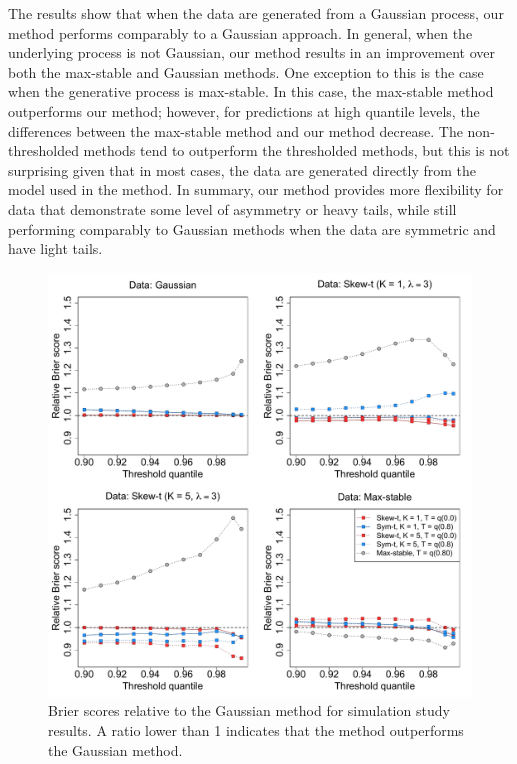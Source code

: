 \documentclass[11pt]{article}
\begin{document}
The results show that when the data are generated from a Gaussian process, our method performs comparably to a Gaussian approach.
In general, when the underlying process is not Gaussian, our method results in an improvement over both the max-stable and Gaussian methods.
One exception to this is the case when the generative process is max-stable.
In this case, the max-stable method outperforms our method; however, for predictions at high quantile levels, the differences between the max-stable method and our method decrease.
The non-thresholded methods tend to outperform the thresholded methods, but this is not surprising given that in most cases, the data are generated directly from the model used in the method.
In summary, our method provides more flexibility for data that demonstrate some level of asymmetry or heavy tails, while still performing comparably to Gaussian methods when the data are symmetric and have light tails.

\begin{figure}
  \includegraphics[width=\linewidth]{plots/bsplots-mean.pdf}
  \caption{Brier scores relative to the Gaussian method for simulation study results. A ratio lower than 1 indicates that the method outperforms the Gaussian method.}
  \label{fig:simbrierscores}
\end{figure}
\end{document}
